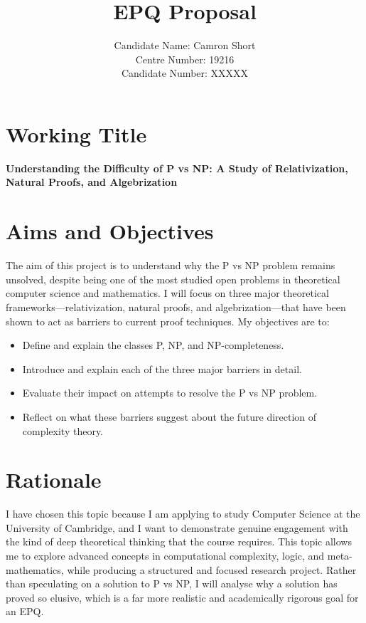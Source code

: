 \documentclass[12pt]{article}
\title{EPQ Proposal}
\author{Candidate Name: Camron Short\\Centre Number: 19216\\Candidate Number: XXXXX}
\date{}
\begin{document}
\maketitle

\section*{Working Title}
\textbf{Understanding the Difficulty of P vs NP: A Study of Relativization, Natural Proofs, and Algebrization}

\section*{Aims and Objectives}
The aim of this project is to understand why the P vs NP problem remains unsolved, despite being one of the most studied open problems in theoretical computer science and mathematics. I will focus on three major theoretical frameworks—relativization, natural proofs, and algebrization—that have been shown to act as barriers to current proof techniques. My objectives are to:
\begin{itemize}
    \item Define and explain the classes P, NP, and NP-completeness.
    \item Introduce and explain each of the three major barriers in detail.
    \item Evaluate their impact on attempts to resolve the P vs NP problem.
    \item Reflect on what these barriers suggest about the future direction of complexity theory.
\end{itemize}

\section*{Rationale}
I have chosen this topic because I am applying to study Computer Science at the University of Cambridge, and I want to demonstrate genuine engagement with the kind of deep theoretical thinking that the course requires. This topic allows me to explore advanced concepts in computational complexity, logic, and meta-mathematics, while producing a structured and focused research project. Rather than speculating on a solution to P vs NP, I will analyse why a solution has proved so elusive, which is a far more realistic and academically rigorous goal for an EPQ.
\end{document}
